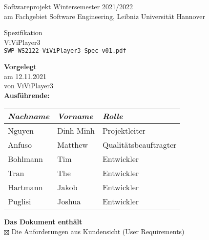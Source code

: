 \documentclass[a4paper, 12pt]{article}
\begin{document}
	\thispagestyle{empty} %
	\begin{center}
		{\Huge Softwareprojekt Wintersemester 2021/2022}\\[.35cm]
		{\large am Fachgebiet Software Engineering, Leibniz Universität Hannover}\\[.1cm]
	\end{center}
	\begin{center}
	\colorbox{lightlightgray}{
		\begin{minipage}{\linewidth}
			\begin{center}
				\vspace{0.2cm}
				{\Huge Spezifikation}\\[.1cm]
				{\Huge ViViPlayer3}\\[.3cm]
				\texttt{SWP-WS2122-ViViPlayer3-Spec-v01.pdf}
				\vspace{0.2cm}
			\end{center}
		\end{minipage}
	}
	\end{center}
	\textbf{Vorgelegt}\\
		\hspace*{1cm}am 12.11.2021 \\
		\hspace*{1cm}von ViViPlayer3\\[0.2cm]
	\textbf{Ausführende:}
		\begin{center}
			\begin{tabular}{|l|l|l|}
				\hline
				\textit{Nachname} 				& \textit{Vorname} 	& \textit{Rolle} \\ \hline\hline
				Nguyen							& Dinh Minh			& Projektleiter \\ \hline
				Anfuso							& Matthew			& Qualitätsbeauftragter \\ \hline
				Bohlmann						& Tim				& Entwickler \\ \hline
				Tran							& The				& Entwickler \\ \hline
				Hartmann						& Jakob				& Entwickler \\ \hline
				Puglisi							& Joshua			& Entwickler \\ \hline
			\end{tabular}
		\end{center}
		\vspace{0.3cm}
	\textbf{Das Dokument enthält}\\[0.1cm]
		\hspace*{1cm}$\boxtimes$ Die Anforderungen aus Kundensicht (User Requirements)\\[0.1cm]
\end{document}
